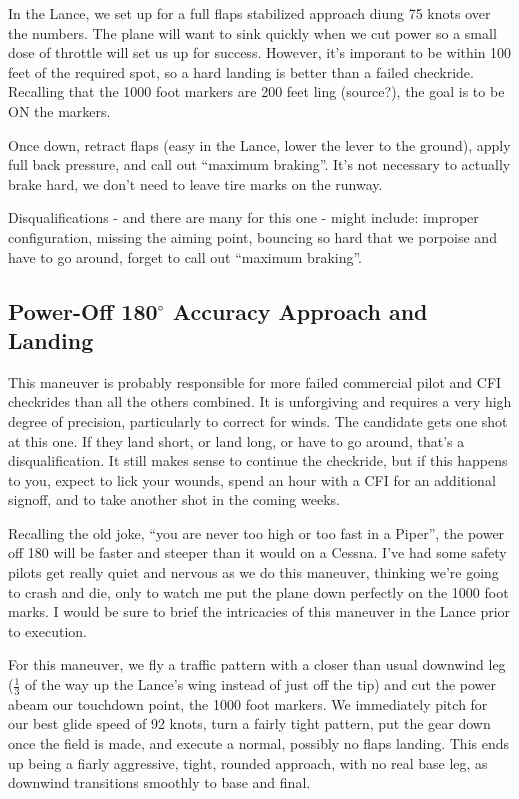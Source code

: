In the Lance, we set up for a full flaps stabilized approach diung 75 knots over the numbers. The plane will want to sink quickly when we cut power so a small dose of throttle will set us up for success. However, it's imporant to be within 100 feet of the required spot, so a hard landing is better than a failed checkride. Recalling that the 1000 foot markers are 200 feet ling (source?), the goal is to be ON the markers.

Once down, retract flaps (easy in the Lance, lower the lever to the ground), apply full back pressure, and call out ``maximum braking''. It's not necessary to actually brake hard, we don't need to leave tire marks on the runway.

Disqualifications - and there are many for this one - might include: improper configuration, missing the aiming point, bouncing so hard that we porpoise and have to go around, forget to call out ``maximum braking''.

\subsection{Power-Off 180$^\circ$ Accuracy Approach and Landing}

This maneuver is probably responsible for more failed commercial pilot and CFI checkrides than all the others combined. It is unforgiving and requires a very high degree of precision, particularly to correct for winds. The candidate gets one shot at this one. If they land short, or land long, or have to go around, that's a disqualification. It still makes sense to continue the checkride, but if this happens to you, expect to lick your wounds, spend an hour with a CFI for an additional signoff, and to take another shot in the coming weeks.

Recalling the old joke, ``you are never too high or too fast in a Piper'', the power off 180 will be faster and steeper than it would on a Cessna. I've had some safety pilots get really quiet and nervous as we do this maneuver, thinking we're going to crash and die, only to watch me put the plane down perfectly on the 1000 foot marks. I would be sure to brief the intricacies of this maneuver in the Lance prior to execution.

For this maneuver, we fly a traffic pattern with a closer than usual downwind leg ($\frac1 3$ of the way up the Lance's wing instead of just off the tip) and cut the power abeam our touchdown point, the 1000 foot markers. We immediately pitch for our best glide speed of 92 knots, turn a fairly tight pattern, put the gear down once the field is made, and execute a normal, possibly no flaps landing. This ends up being a fiarly aggressive, tight, rounded approach, with no real base leg, as downwind transitions smoothly to base and final.

